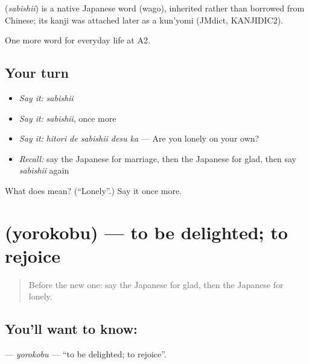 \begin{cousinweb}
\textbf{} (\emph{sabishii}) is a native Japanese word (wago), inherited rather than borrowed from Chinese; its kanji was attached later as a kun'yomi (JMdict, KANJIDIC2).
\end{cousinweb}

\begin{grammarlens}[title={What you've built}]
One more word for everyday life at A2.
\end{grammarlens}

\subsection*{Your turn}
\begin{itemize}
\raggedright
  \item \emph{Say it:} \emph{sabishii}
  \item \emph{Say it:} \emph{sabishii}, once more
  \item \emph{Say it:} \emph{hitori de sabishii desu ka} — Are you lonely on your own?
  \item \emph{Recall:} say the Japanese for marriage, then the Japanese for glad, then say \emph{sabishii} again
\end{itemize}

\begin{tcolorbox}[breakable,colback=teal!4,colframe=teal!35!black,title={Before you move on}]
What does  mean? (\textquotedblleft{}Lonely\textquotedblright{}.) Say it once more.
\end{tcolorbox}
\section[\texorpdfstring{\ja{よろこぶ} (yorokobu)}{よろこぶ (yorokobu)}]{ (yorokobu) — to be delighted; to rejoice}

\label{lesson:JA-C245-yorokobu}



\begin{quote}
Before the new one: say the Japanese for glad, then the Japanese for lonely.
\end{quote}

\subsection*{You'll want to know: }
\textbf{} — \emph{yorokobu} — \textquotedblleft{}to be delighted; to rejoice\textquotedblright{}.

